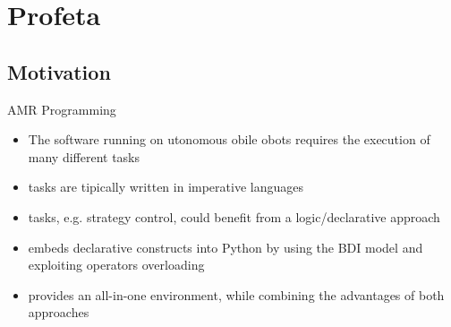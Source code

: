 \section{Profeta}

\subsection{Motivation}
\begin{frame}[label=1]{AMR Programming}
  \begin{itemize}
    \item
      The software running on utonomous obile obots
      requires the execution of many different tasks
\N  
    \item
       tasks are tipically written in imperative languages 
\n
    \item
       tasks, e.g. strategy control, could benefit 
      from a logic/declarative approach
\N\N  
\pause
    \item
       embeds declarative constructs into Python by
      using the BDI model and exploiting operators overloading
\n    
    \item
       provides an all-in-one environment, while combining
      the advantages of both approaches
  \end{itemize}
% 
\N\N
\end{frame}



